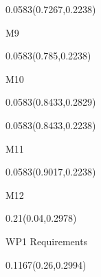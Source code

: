 \documentclass[aspectratio=169]{beamer}
\begin{document}
\begin{frame}[t]
\begin{textblock}{0.0583}(0.7267,0.2238)
{\centering\fontsize{10}{12}\selectfont \textcolor[HTML]{555555}{M9}\par}
\end{textblock}

\begin{textblock}{0.0583}(0.785,0.2238)
{\centering\fontsize{10}{12}\selectfont \textcolor[HTML]{555555}{M10}\par}
\end{textblock}

%
\begin{textblock}{0.0583}(0.8433,0.2829)
\end{textblock}

\begin{textblock}{0.0583}(0.8433,0.2238)
{\centering\fontsize{10}{12}\selectfont \textcolor[HTML]{555555}{M11}\par}
\end{textblock}

\begin{textblock}{0.0583}(0.9017,0.2238)
{\centering\fontsize{10}{12}\selectfont \textcolor[HTML]{555555}{M12}\par}
\end{textblock}

\begin{textblock}{0.21}(0.04,0.2978)
{\raggedright\fontsize{12}{14}\selectfont WP1 Requirements\par}
\end{textblock}

%
%
\begin{textblock}{0.1167}(0.26,0.2994)
\end{textblock}


\end{frame}
\end{document}
